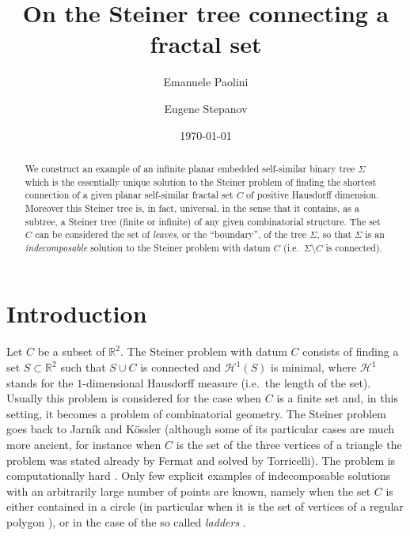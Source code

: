 \documentclass{amsart}
\author[Paolini]{Emanuele Paolini}
\author[Stepanov]{Eugene Stepanov}
\date{\today}
\title{On the Steiner tree connecting a fractal set}
\newcommand{\RR}{\mathbb R}
\renewcommand{\H}{\mathcal H}
\renewcommand{\H}{\mathcal{H}}
\theoremstyle{definition}
\theoremstyle{remark}
\begin{document}
\begin{abstract}
We construct an example of an infinite planar embedded self-similar binary tree  
$\Sigma$ which is the essentially unique solution to the Steiner problem of finding 
the shortest connection of a given planar self-similar fractal set $C$
of positive Hausdorff dimension.
Moreover this Steiner tree is, in fact, universal, in the sense that 
it contains, as a subtree, a Steiner tree (finite or infinite) of any given combinatorial structure.
The set $C$ can be considered the set of \emph{leaves}, or the ``boundary'',
of the tree $\Sigma$,
so that $\Sigma$ is an \emph{indecomposable} solution to the Steiner problem
with datum $C$ (i.e.\ $\Sigma\setminus C$ is connected).
\end{abstract}

\maketitle

\section{Introduction}

Let $C$ be a subset of $\RR^2$.
The Steiner problem with datum $C$ consists of finding a set $S\subset \RR^2$ 
such that $S\cup C$ is connected and $\H^1(S)$ is minimal, where $\H^1$ stands 
for the $1$-dimensional Hausdorff measure (i.e.\ the length of the set).
Usually this problem is considered for the case when $C$ is a finite 
set and, in this setting, it becomes a problem of combinatorial geometry. 
The Steiner problem goes back to Jarník and Kössler \cite{JarKos34} 
(although some of its particular cases are much more ancient, for instance 
when $C$ is the set of the three vertices of a triangle the problem was 
stated already by Fermat and solved by Torricelli).
The problem is computationally hard \cite{GarGraJoh77}.
Only few explicit examples of indecomposable solutions with an arbitrarily large number of points 
are known, namely when the set $C$ is either contained in a circle 
\cite{Rub97}
(in particular when it is the set of vertices of a regular polygon
\cite{DuHwaWen87}),
or in the case of the so called \emph{ladders} 
\cite{BurDudMai96,BurDud96,ChuGra78}.
\end{document}
